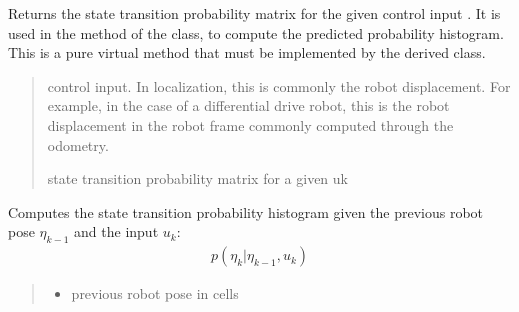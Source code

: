 \documentclass[letterpaper,10pt,english]{sphinxmanual}
\begin{document}
\begin{fulllineitems}
\begin{fulllineitems}
\label{\detokenize{GridLocalization:GL_3DOFDifferentialDrive.GL_3DOFDifferentialDrive.StateTransitionProbability_4_uk}}
\pysigstartsignatures
{}
\pysigstopsignatures
\sphinxAtStartPar
Returns the state transition probability matrix for the given control input . It is used in the  method
of the  class, to compute the predicted probability histogram.
This is a pure virtual method that must be implemented by the derived class.
\begin{quote}\begin{description}
\sphinxAtStartPar
{} \textendash{} control input. In localization, this is commonly the robot displacement. For example, in the case of a differential drive robot, this is the robot displacement in the robot frame commonly computed through the odometry.

\sphinxAtStartPar
{} state transition probability matrix for a given uk

\end{description}\end{quote}

\end{fulllineitems}


\begin{fulllineitems}
\label{\detokenize{GridLocalization:GL_3DOFDifferentialDrive.GL_3DOFDifferentialDrive.StateTransitionProbability_4_xk_1_uk}}
\pysigstartsignatures
{}
\pysigstopsignatures
\sphinxAtStartPar
Computes the state transition probability histogram given the previous robot pose \(\eta_{k-1}\) and the input \(u_k\):
\begin{equation*}
\begin{split}p(\eta_k | \eta_{k-1}, u_k)\end{split}
\end{equation*}\begin{quote}\begin{description}
\begin{itemize}
\item {} 
\sphinxAtStartPar
{} \textendash{} previous robot pose in cells


\end{itemize}
\end{description}
\end{quote}
\end{fulllineitems}
\end{fulllineitems}
\end{document}
